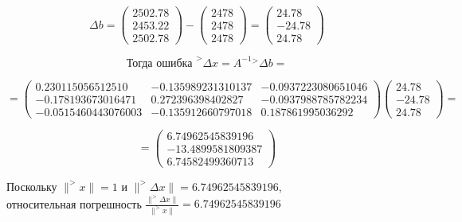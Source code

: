 \documentclass[a4paper, 12pt]{extarticle}
\begin{document}
\begin{equation}
    \Delta b =
    \begin{pmatrix}
        2502.78 \\ 
        2453.22 \\ 
        2502.78 
    \end{pmatrix}
    -
    \begin{pmatrix}
        2478 \\ 
        2478 \\ 
        2478 
    \end{pmatrix}
    =
    \begin{pmatrix}
        24.78 \\
        -24.78 \\
        24.78         
    \end{pmatrix}
\end{equation}

\begin{equation*}
    \textrm{Тогда ошибка } ^> \Delta x = A^{-1}{^> \Delta b} =
\end{equation*}

\begin{equation*}
    = 
    \begin{pmatrix}
        0.230115056512510   & -0.135989231310137 & -0.0937223080651046 \\ 
        -0.178193673016471  & 0.272396398402827  & -0.0937988785782234 \\ 
        -0.0515460443076003 & -0.135912660797018 & 0.187861995036292 
    \end{pmatrix}
    \begin{pmatrix}
        24.78 \\
        -24.78 \\
        24.78         
    \end{pmatrix}
    =
\end{equation*}

\begin{equation}
    =
    \begin{pmatrix}
        6.74962545839196 \\
        -13.4899581809387 \\
        6.74582499360713        
    \end{pmatrix}
\end{equation}

\begin{spacing}{1.5}
Поскольку $\lVert ^>x \rVert = 1$ и $\lVert ^> \Delta x \rVert = 6.74962545839196$, \\
относительная погрешность $\frac{\lVert ^> \Delta x \rVert}{\lVert ^>x \rVert} = 6.74962545839196$
\end{spacing}
\end{document}
